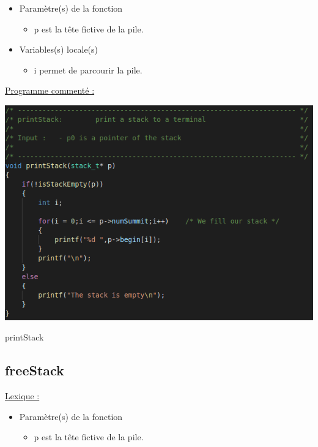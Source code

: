 \documentclass[a4paper]{article}
\begin{document}
\begin{itemize}

\item Paramètre(s) de la fonction  

\begin{itemize}

\item p est la tête fictive de la pile.

\end{itemize}
\item Variables(s) locale(s)  

\begin{itemize}

\item i permet de parcourir la pile.

\end{itemize}

\end{itemize}

\underline{Programme commenté :}
\begin{center}
\includegraphics[scale=0.4]{printStack.png}

printStack
\end{center}
\subsection{freeStack}
\underline{Lexique :}

\begin{itemize}

\item Paramètre(s) de la fonction  

\begin{itemize}

\item p est la tête fictive de la pile.

\end{itemize}

\end{itemize}
\end{document}
